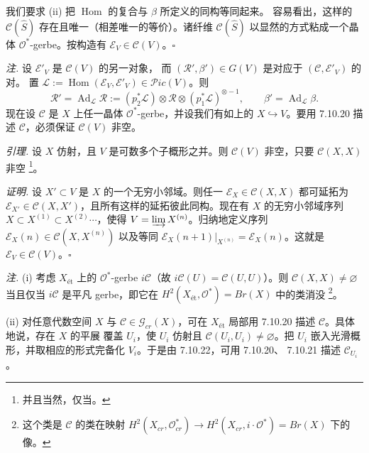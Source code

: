 我们要求 (ii) 把 $\operatorname{Hom}$ 的复合与 $\beta$ 所定义的同构等同起来。
容易看出，这样的 $\mathcal{C}(\hat S)$ 存在且唯一（相差唯一的等价）。诸纤维
$\mathcal{C}(\hat S)$ 以显然的方式粘成一个晶体 $\mathcal{O}^*$-gerbe。按构造有
$\mathcal{E}_V\in\mathcal{C}(V)$。\hfill$\square$

 \emph{注.} 设 $\mathcal{E}'_V$ 是 $\mathcal{C}(V)$ 的另一对象，
而 $(\mathcal{R}',\beta')\in G(V)$ 是对应于 $(\mathcal{C},\mathcal{E}'_V)$ 的对。
置 $\mathcal{L}:=\operatorname{Hom}(\mathcal{E}_V,\mathcal{E}'_V)
\in\mathcal{P}ic(V)$。则
\[
\mathcal{R}'=\operatorname{Ad}_{\mathcal{L}}\mathcal{R}
:=(p_2^*\mathcal{L})\otimes\mathcal{R}\otimes(p_1^*\mathcal{L})^{\otimes-1},
\qquad
\beta'=\operatorname{Ad}_{\mathcal{L}}\beta .
\]
现在设 $\mathcal{C}$ 是 $X$ 上任一晶体 $\mathcal{O}^*$-gerbe，并设我们有如上的
$X\hookrightarrow V$。要用 7.10.20 描述 $\mathcal{C}$，必须保证
$\mathcal{C}(V)$ 非空。

 \emph{引理.} 设 $X$ 仿射，且 $V$ 是可数多个子概形之并。则
$\mathcal{C}(V)$ 非空，只要 $\mathcal{C}(X,X)$ 非空%
\footnote{并且当然，仅当。}。

\emph{证明.} 设 $X'\subset V$ 是 $X$ 的一个无穷小邻域。则任一
$\mathcal{E}_X\in\mathcal{C}(X,X)$ 都可延拓为
$\mathcal{E}_{X'}\in\mathcal{C}(X,X')$，且所有这样的延拓彼此同构。现在有 $X$
的无穷小邻域序列 $X\subset X^{(1)}\subset X^{(2)}\cdots$，使得
$V=\varinjlim X^{(n)}$。归纳地定义序列
$\mathcal{E}_X(n)\in\mathcal{C}(X,X^{(n)})$ 以及等同
$\mathcal{E}_X(n+1)|_{X^{(n)}}=\mathcal{E}_X(n)$。这就是
$\mathcal{E}_V\in\mathcal{C}(V)$。\hfill$\square$


 \emph{注.} (i) 考虑 $X_{\text{ét}}$ 上的 $\mathcal{O}^*$-gerbe
$i\mathcal{C}$（故 $i\mathcal{C}(U)=\mathcal{C}(U,U)$）。则
$\mathcal{C}(X,X)\neq\varnothing$ 当且仅当 $i\mathcal{C}$ 是平凡 gerbe，即它在
$H^2(X_{\text{ét}},\mathcal{O}^*)=Br(X)$ 中的类消没%
\footnote{这个类是 $\mathcal{C}$ 的类在映射
$H^2(X_{cr},\mathcal{O}^*_{cr})\to
H^2(X_{cr},i\cdot\mathcal{O}^*)=Br(X)$ 下的像。}。

(ii) 对任意代数空间 $X$ 与 $\mathcal{C}\in\mathcal{G}_{cr}(X)$，可在
$X_{\text{ét}}$ 局部用 7.10.20 描述 $\mathcal{C}$。具体地说，存在 $X$ 的平展
覆盖 $U_i$，使 $U_i$ 仿射且 $\mathcal{C}(U_i,U_i)\neq\varnothing$。把 $U_i$
嵌入光滑概形，并取相应的形式完备化 $V_i$。于是由 7.10.22，可用 7.10.20、
7.10.21 描述 $\mathcal{C}_{U_i}$。

